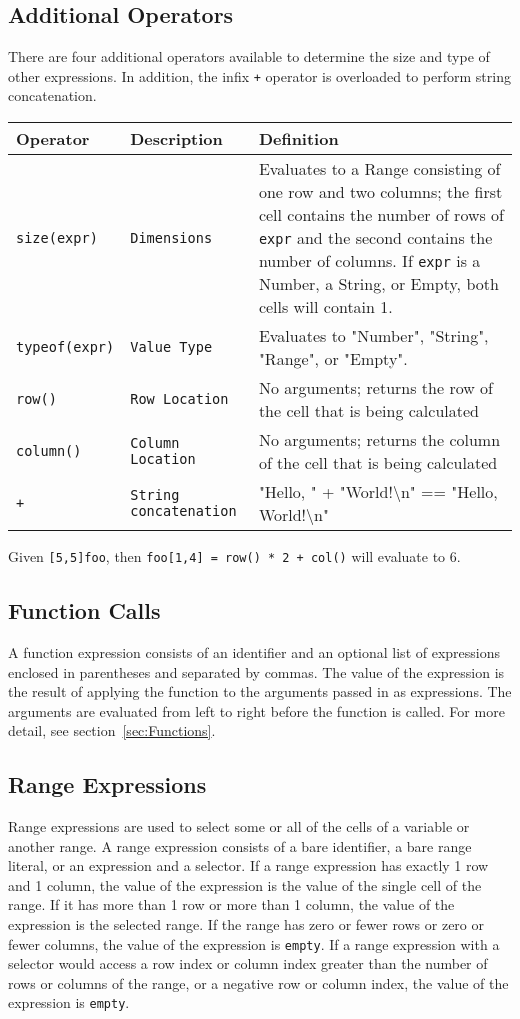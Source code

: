 \subsection {Additional Operators}
There are four additional operators available to determine the size and type of other expressions. In addition, the infix \texttt{+} operator is overloaded to perform string concatenation.
\begin{table}[H]
\begin{tabular}{ |p{2cm}|p{3cm}|p{8cm}|  }
\hline
\textbf{Operator} & \textbf{Description} & \textbf{Definition} \\ \hline
\texttt{size(expr)} & \texttt{Dimensions} & {Evaluates to a Range consisting of one row and two columns; the first cell contains the number of rows of \texttt{expr} and the second contains the number of columns. If \texttt{expr} is a Number, a String, or Empty, both cells will contain 1.} \\ \hline
\texttt{typeof(expr)} & \texttt{Value Type} & {Evaluates to "Number", "String", "Range", or "Empty".} \\ \hline
\texttt{row()} & \texttt{Row Location} & {No arguments; returns the row of the cell that is being calculated} \\ \hline
\texttt{column()} & \texttt{Column Location} & {No arguments; returns the column of the cell that is being calculated} \\ \hline
\texttt{+} & \texttt{String concatenation} & {"Hello, " + "World!\textbackslash n" == "Hello, World!\textbackslash n"}\\ \hline
\end{tabular}
\end{table}
Given \texttt{[5,5]foo}, then \texttt{foo[1,4] = row() * 2 + col()} will evaluate to 6.
\subsection {Function Calls}
A function expression consists of an identifier and an optional list of expressions enclosed in parentheses and separated by commas. The value of the expression is the result of applying the function to the arguments passed in as expressions. The arguments are evaluated from left to right before the function is called. For more detail, see section~\ref{sec:Functions}.
\subsection{Range Expressions}
Range expressions are used to select some or all of the cells of a variable or another range. A range expression consists of a bare identifier, a bare range literal, or an expression and a selector. If a range expression has exactly 1 row and 1 column, the value of the expression is the value of the single cell of the range. If it has more than 1 row or more than 1 column, the value of the expression is the selected range. If the range has zero or fewer rows or zero or fewer columns, the value of the expression is \texttt{empty}. If a range expression with a selector would access a row index or column index greater than the number of rows or columns of the range, or a negative row or column index, the value of the expression is \texttt{empty}.
